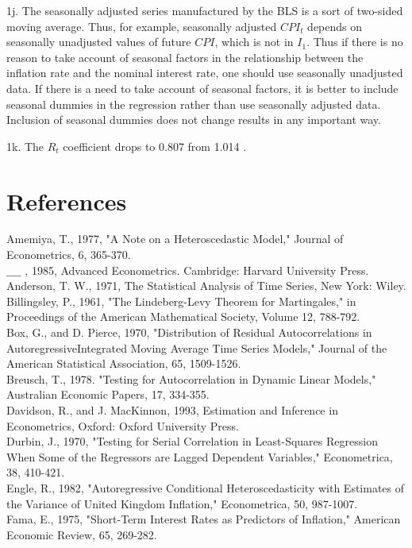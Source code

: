 \documentclass[10pt]{article}
\begin{document}
1j. The seasonally adjusted series manufactured by the BLS is a sort of two-sided moving average. Thus, for example, seasonally adjusted $C P I_{t}$ depends on seasonally unadjusted values of future $C P I$, which is not in $I_{1}$. Thus if there is no reason to take account of seasonal factors in the relationship between the inflation rate and the nominal interest rate, one should use seasonally unadjusted data. If there is a need to take account of seasonal factors, it is better to include seasonal dummies in the regression rather than use seasonally adjusted data. Inclusion of seasonal dummies does not change results in any important way.

1k. The $R_{t}$ coefficient drops to 0.807 from 1.014 .

\section*{References}
Amemiya, T., 1977, "A Note on a Heteroscedastic Model," Journal of Econometrics, 6, 365-370.\\
$\_\_\_\_$ , 1985, Advanced Econometrics. Cambridge: Harvard University Press.\\
Anderson, T. W., 1971, The Statistical Analysis of Time Series, New York: Wiley.\\
Billingsley, P., 1961, "The Lindeberg-Levy Theorem for Martingales," in Proceedings of the American Mathematical Society, Volume 12, 788-792.\\
Box, G., and D. Pierce, 1970, "Distribution of Residual Autocorrelations in AutoregressiveIntegrated Moving Average Time Series Models," Journal of the American Statistical Association, 65, 1509-1526.\\
Breusch, T., 1978. "Testing for Autocorrelation in Dynamic Linear Models," Australian Economic Papers, 17, 334-355.\\
Davidson, R., and J. MacKinnon, 1993, Estimation and Inference in Econometrics, Oxford: Oxford University Press.\\
Durbin, J., 1970, "Testing for Serial Correlation in Least-Squares Regression When Some of the Regressors are Lagged Dependent Variables," Econometrica, 38, 410-421.\\
Engle, R., 1982, "Autoregressive Conditional Heteroscedasticity with Estimates of the Variance of United Kingdom Inflation," Econometrica, 50, 987-1007.\\
Fama, E., 1975, "Short-Term Interest Rates as Predictors of Inflation," American Economic Review, 65, 269-282.\\
\end{document}
